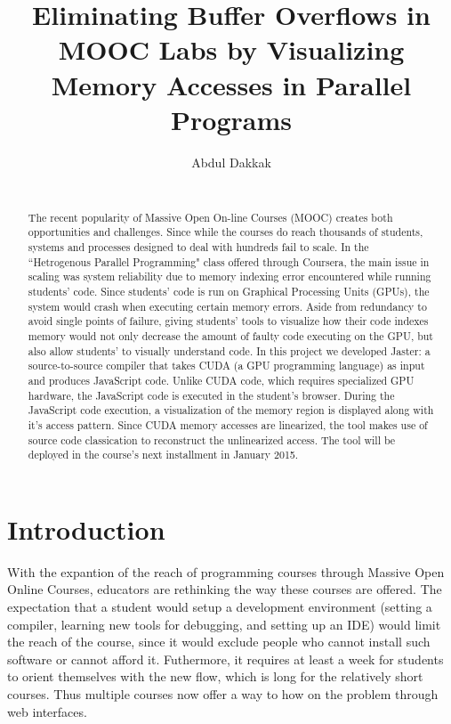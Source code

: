 \documentclass[nocopyrightspace]{sigchi}
\begin{document}
\title{Eliminating Buffer Overflows in MOOC Labs by Visualizing Memory Accesses in Parallel Programs}

\author{
  \alignauthor Abdul Dakkak\\
    \\
    }

\maketitle

\begin{abstract}
  The recent popularity of Massive Open On-line Courses (MOOC) creates
  both opportunities and challenges. Since while the courses do reach
  thousands of students, systems and processes designed to deal with
  hundreds fail to scale. In the ``Hetrogenous Parallel Programming" class
  offered through Coursera, the main issue in scaling was system reliability due
  to memory indexing error encountered while running students' code.
  Since students' code is run on Graphical Processing Units (GPUs), the system
  would crash when executing certain memory errors. Aside from redundancy to avoid
  single points of failure, giving students' tools to visualize how their code
  indexes memory would not only decrease the amount of faulty code executing on
  the GPU, but also allow students' to visually understand code.
  In this project we developed Jaster: a source-to-source compiler that takes
  CUDA (a GPU programming language) as input and produces JavaScript code.
  Unlike CUDA code, which requires
  specialized GPU hardware, the JavaScript code is executed
  in the student's browser. During the JavaScript code execution, a visualization
  of the memory region is displayed along with it's access pattern.
  Since CUDA memory accesses are linearized, the tool makes use of source code
  classication to reconstruct the unlinearized access.
  The tool will be deployed in the course's next installment in January 2015.
\end{abstract}


\section{Introduction}


With the expantion of the reach of programming courses through Massive Open Online Courses,
educators are rethinking the way these courses are offered. The expectation that a 
student would setup a development environment (setting a compiler, learning 
new tools for debugging, and setting up an IDE) would limit the reach of the course, since
it would exclude people who cannot install such software or cannot afford it. 
Futhermore, it requires at least a week for students to orient themselves with the 
new flow, which is long for the relatively short courses.
Thus multiple courses now offer a way to how on the problem through web interfaces.
\end{document}
